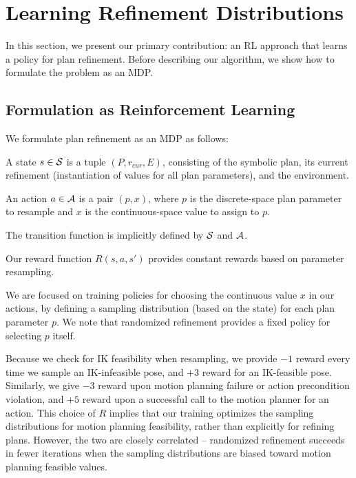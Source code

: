 \section{Learning Refinement Distributions}
In this section, we present our primary contribution: an RL
approach that learns a policy for plan refinement. Before describing our
algorithm, we show how to formulate the problem as an MDP.

\subsection{Formulation as Reinforcement Learning}
We formulate plan refinement as an MDP as follows:
\begin{tightlist}
\item A state $s \in \mathcal{S}$ is a tuple $(P, r_{cur}, E)$, consisting of the
symbolic plan, its current refinement (instantiation of values for all plan parameters),
and the environment.
\item An action $a \in \mathcal{A}$ is a pair $(p, x)$, where $p$ is the discrete-space plan
parameter to resample and $x$ is the continuous-space value to assign to $p$.
\item The transition function is implicitly defined by $\mathcal{S}$ and $\mathcal{A}$.
\item Our reward function $R(s, a, s')$ provides constant rewards based on parameter resampling.
\end{tightlist}

We are focused on training policies for choosing the continuous value
$x$ in our actions, by defining a sampling distribution (based on the state) for each plan parameter $p$.
We note that randomized refinement provides a fixed policy for selecting $p$ itself.

Because we check for IK feasibility when resampling, we provide $-1$ reward every
time we sample an IK-infeasible pose, and $+3$ reward for an IK-feasible pose.
Similarly, we give $-3$ reward upon motion planning failure or action precondition violation,
and $+5$ reward upon a successful call to the motion planner for an action.
This choice of $R$ implies that our training optimizes the sampling distributions for
motion planning feasibility, rather than explicitly for refining plans. However, the two are
closely correlated -- randomized refinement succeeds in fewer iterations when the sampling
distributions are biased toward motion planning feasible values.

